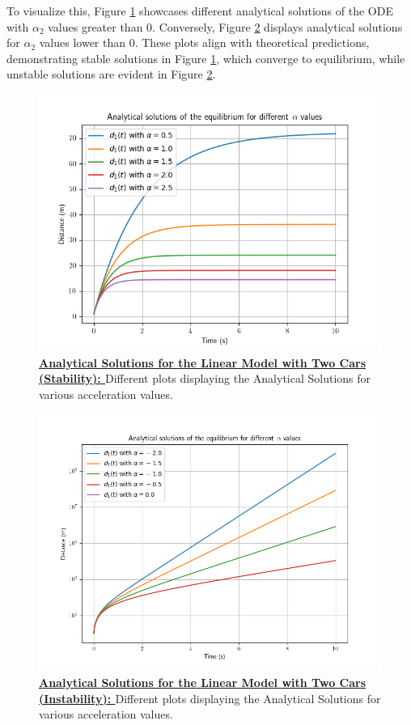 \documentclass{article}
\begin{document}
		To visualize this, Figure \ref{fig:AS1} showcases different analytical solutions of the ODE with \(\alpha_2\) values greater than 0. Conversely, Figure \ref{fig:AS2} displays analytical solutions for \(\alpha_2\) values lower than 0. These plots align with theoretical predictions, demonstrating stable solutions in Figure \ref{fig:AS1}, which converge to equilibrium, while unstable solutions are evident in Figure \ref{fig:AS2}.
		
		\begin{figure}[H]
			\centering
			\includegraphics[width=0.8\linewidth]{Stability.png}
			\caption[Analytical Solutions for the Linear Model with Two Cars]{\textbf{\underline{Analytical Solutions for the Linear Model with Two Cars (Stability): }}Different plots displaying the Analytical Solutions for various acceleration values.}
			\label{fig:AS1}
		\end{figure}
		
		\begin{figure}[H]
			\centering
			\includegraphics[width=0.8\linewidth]{Unstability.png}
			\caption[Analytical Solutions for the Linear Model with Two Cars]{\textbf{\underline{Analytical Solutions for the Linear Model with Two Cars (Instability): }}Different plots displaying the Analytical Solutions for various acceleration values.}
			\label{fig:AS2}
		\end{figure}
		
\end{document}
